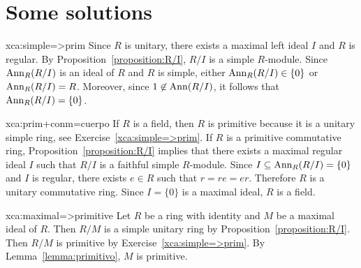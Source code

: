 \chapter*{Some solutions}


\begin{sol}{xca:simple=>prim} 
	Since $R$ is unitary, there exists a maximal left ideal $I$ and $R$ is regular.
	By Proposition~\ref{proposition:R/I}, $R/I$ is a simple $R$-module. 
	Since $\operatorname{Ann}_R(R/I)$ is an ideal of $R$ and $R$ is simple, either $\operatorname{Ann}_R(R/I)\in\{0\}$ or 
	$\operatorname{Ann}_R(R/I)=R$. Moreover, since 
	$1\not\in\operatorname{Ann}(R/I)$, it follows that 
	$\operatorname{Ann}_R(R/I)=\{0\}$. 
\end{sol}

\begin{sol}{xca:prim+conm=cuerpo}
	If $R$ is a field, then $R$ is primitive because it is a unitary simple ring, see  
	Exercise~\ref{xca:simple=>prim}. If $R$ is a primitive commutative ring, Proposition~\ref{proposition:R/I} implies that there exists a maximal regular ideal $I$
	such that  
	$R/I$ is a faithful simple $R$-module. 
	Since $I\subseteq \operatorname{Ann}_R(R/I)=\{0\}$ and $I$ is regular, there exists $e\in R$ such that 
	$r=re=er$. Therefore $R$ is a unitary commutative ring. Since $I=\{0\}$ is a maximal ideal, 
	$R$ is a field. 
\end{sol}

\begin{sol}{xca:maximal=>primitive}
	Let $R$ be a ring with identity and $M$ be a maximal ideal of $R$. Then 
	$R/M$ is a simple unitary ring by 
	Proposition~\ref{proposition:R/I}. Then $R/M$ is primitive by
	Exercise~\ref{xca:simple=>prim}. By Lemma~\ref{lemma:primitivo}, 
	$M$ is primitive. 
\end{sol}


    
